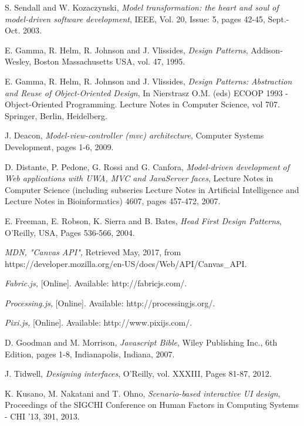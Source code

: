 \begin{thebibliography}{1}
	 S. Sendall and W. Kozaczynski, {\em Model transformation: the heart and soul of model-driven software development},  IEEE, Vol. 20, Issue: 5, pages 42-45, Sept.-Oct. 2003.
	
	 E. Gamma, R. Helm, R. Johnson and J. Vlissides, {\em Design Patterns},  Addison-Wesley, Boston Massachusetts USA, vol. 47, 1995.
	
	 E. Gamma, R. Helm, R. Johnson and J. Vlissides, {\em Design Patterns: Abstraction and Reuse of Object-Oriented Design}, In Nierstrasz O.M. (eds) ECOOP 1993 - Object-Oriented Programming. Lecture Notes in Computer Science, vol 707. Springer, Berlin, Heidelberg.
	
	 J. Deacon, { \em Model-view-controller (mvc) architecture}, Computer Systems Development, pages 1-6, 2009.
	
	 D. Distante, P. Pedone, G. Rossi and G. Canfora, { \em Model-driven development of Web applications with UWA, MVC and JavaServer faces}, Lecture Notes in Computer Science (including subseries Lecture Notes in Artificial Intelligence and Lecture Notes in Bioinformatics) 4607, pages 457-472, 2007.
	
	 E. Freeman, E. Robson, K. Sierra and B. Bates, { \em Head First Design Patterns}, O'Reilly, USA, Pages 536-566, 2004.
	
	 {\em MDN, "Canvas API",} Retrieved May, 2017, from https://developer.mozilla.org/en-US/docs/Web/API/Canvas\_API.
	
	 {\em Fabric.js,} [Online]. Available: http://fabricjs.com/.
	
	 {\em Processing.js,} [Online]. Available: http://processingjs.org/.
	
	 {\em Pixi.js,} [Online]. Available: http://www.pixijs.com/.
	
	 D. Goodman and M. Morrison, {\em Javascript Bible}, Wiley Publishing Inc., 6th Edition, pages 1-8, Indianapolis, Indiana, 2007.
	
	 J. Tidwell, {\em Designing interfaces}, O'Reilly, vol. XXXIII, Pages 81-87, 2012.
	
	 K. Kusano, M. Nakatani and T. Ohno, {\em Scenario-based interactive UI design}, Proceedings of the SIGCHI Conference on Human Factors in Computing Systems - CHI '13, 391,  2013.
	
\end{thebibliography}



